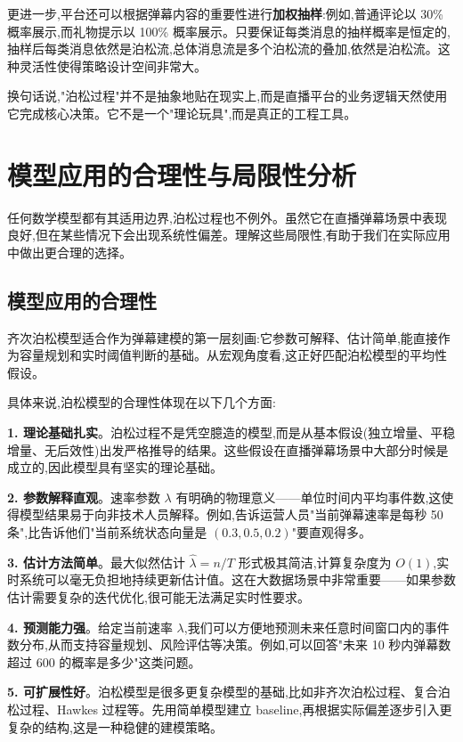 \documentclass[12pt,a4paper]{article}
\begin{document}
更进一步,平台还可以根据弹幕内容的重要性进行\textbf{加权抽样}:例如,普通评论以 30\% 概率展示,而礼物提示以 100\% 概率展示。只要保证每类消息的抽样概率是恒定的,抽样后每类消息依然是泊松流,总体消息流是多个泊松流的叠加,依然是泊松流。这种灵活性使得策略设计空间非常大。

换句话说,"泊松过程"并不是抽象地贴在现实上,而是直播平台的业务逻辑天然使用它完成核心决策。它不是一个"理论玩具",而是真正的工程工具。

\section{模型应用的合理性与局限性分析}

任何数学模型都有其适用边界,泊松过程也不例外。虽然它在直播弹幕场景中表现良好,但在某些情况下会出现系统性偏差。理解这些局限性,有助于我们在实际应用中做出更合理的选择。

\subsection{模型应用的合理性}

齐次泊松模型适合作为弹幕建模的第一层刻画:它参数可解释、估计简单,能直接作为容量规划和实时阈值判断的基础。从宏观角度看,这正好匹配泊松模型的平均性假设。

具体来说,泊松模型的合理性体现在以下几个方面:

\textbf{1. 理论基础扎实}。泊松过程不是凭空臆造的模型,而是从基本假设(独立增量、平稳增量、无后效性)出发严格推导的结果。这些假设在直播弹幕场景中大部分时候是成立的,因此模型具有坚实的理论基础。

\textbf{2. 参数解释直观}。速率参数 $\lambda$ 有明确的物理意义——单位时间内平均事件数,这使得模型结果易于向非技术人员解释。例如,告诉运营人员"当前弹幕速率是每秒 50 条",比告诉他们"当前系统状态向量是 $(0.3, 0.5, 0.2)$"要直观得多。

\textbf{3. 估计方法简单}。最大似然估计 $\hat{\lambda} = n/T$ 形式极其简洁,计算复杂度为 $O(1)$,实时系统可以毫无负担地持续更新估计值。这在大数据场景中非常重要——如果参数估计需要复杂的迭代优化,很可能无法满足实时性要求。

\textbf{4. 预测能力强}。给定当前速率 $\lambda$,我们可以方便地预测未来任意时间窗口内的事件数分布,从而支持容量规划、风险评估等决策。例如,可以回答"未来 10 秒内弹幕数超过 600 的概率是多少"这类问题。

\textbf{5. 可扩展性好}。泊松模型是很多更复杂模型的基础,比如非齐次泊松过程、复合泊松过程、Hawkes 过程等。先用简单模型建立 baseline,再根据实际偏差逐步引入更复杂的结构,这是一种稳健的建模策略。
\end{document}
